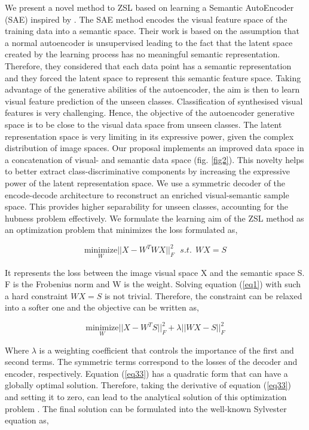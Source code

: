 \documentclass{article}
\begin{document}
We present a novel method to ZSL based on learning a Semantic AutoEncoder (SAE) inspired by \cite{b10}. The SAE method encodes the visual feature space of the training data into a semantic space. Their work is based on the assumption that a normal autoencoder is unsupervised leading to the fact that the latent space created by the learning process has no meaningful semantic representation. Therefore, they considered that each data point has a semantic representation and they forced the latent space to represent this semantic feature space. Taking advantage of the generative abilities of the autoencoder, the aim is then to learn visual feature prediction of the unseen classes. Classification of synthesised visual features is very challenging. Hence, the objective of the autoencoder generative space is to be close to the visual data space from unseen classes. The latent representation space is very limiting in its expressive power, given the complex distribution of image spaces. Our proposal implements an improved data space in a concatenation of visual- and semantic data space (fig. \ref{fig2}). This novelty helps to better extract class-discriminative components by increasing the expressive power of the latent representation space. We use a symmetric decoder of the encode-decode architecture to reconstruct an enriched visual-semantic sample space. This provides higher separability for unseen classes, accounting for the hubness problem effectively. We formulate the learning aim of the ZSL method as an optimization problem that minimizes the loss formulated as, 

\begin{equation}
\label{eq1}
\underset{W}{\text{minimize}}||X-W^TWX||^{2}_{F}~~~s.t. ~~ WX=S
\end{equation}

It represents the loss between the image visual space X and the semantic space S. F is the Frobenius norm and W is the weight. Solving equation (\ref{eq1}) with such a hard constraint $WX=S$ is not trivial. Therefore, the constraint can be relaxed into a softer one and the objective can be written as, 

\begin{equation}
\label{eq33}
\underset{W}{\text{minimize}} ||X-W^T S||^{2}_{F} + \lambda||WX - S||^{2}_{F}
\end{equation}

Where $\lambda$ is a weighting coefficient that controls the importance of the first and second terms. The symmetric terms correspond to the losses of the decoder and encoder, respectively. Equation (\ref{eq33}) has a quadratic form that can have a globally optimal solution. Therefore, taking the derivative of equation (\ref{eq33}) and setting it to zero, can lead to the analytical solution of this optimization problem \cite{b10}. The final solution can be formulated into the well-known Sylvester equation as, 
\end{document}
